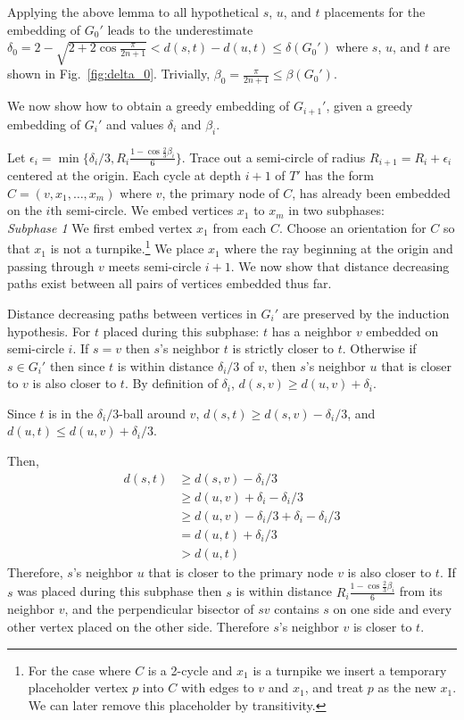\documentclass[11pt]{article}
\begin{document}
Applying the above lemma to all hypothetical $s$, $u$, and $t$ placements for the
embedding of $G_0'$ leads to the underestimate 
$\delta_0 = 2 - \sqrt{2 + 2\cos{\frac{\pi}{2n+1}}} 
< d(s,t)-d(u,t) \leq \delta(G_0')$ where $s$, $u$, and $t$ are shown in Fig.~\ref{fig:delta_0}. Trivially, $\beta_0 = \frac{\pi}{2n+1} \leq \beta(G_0')$.

We now show how to obtain a greedy embedding of $G_{i+1}'$, given a greedy embedding of $G_i'$ and values $\delta_i$ and $\beta_i$.

Let $\epsilon_i = \min\{\delta_i/3, R_i\frac{1-\cos{\frac{2}{3}\beta_i}}{6}\}$.
Trace out a semi-circle of radius $R_{i+1} = R_i + \epsilon_i$ centered at 
the origin. Each cycle at depth $i+1$ of $T'$ has the form $C=(v, x_1,\ldots, x_m)$ 
where $v$, the primary node of $C$, has already been embedded on the $i$th 
semi-circle. We embed vertices $x_1$ to $x_m$ in two subphases: \\

\noindent\emph{Subphase 1} We first embed vertex $x_1$ from each $C$. 
Choose an orientation for $C$ so that $x_1$ is not a turnpike.\footnote{For 
the case where $C$ is a 2-cycle and $x_1$ is a turnpike we insert a
temporary placeholder vertex $p$ into $C$ with edges to $v$ and $x_1$, and treat
$p$ as the new $x_1$. We can later remove this placeholder by transitivity.} We place $x_1$ where the ray beginning at the origin 
and passing through $v$ meets semi-circle $i+1$. We now show that distance 
decreasing paths exist between all pairs of vertices embedded thus far. 

Distance decreasing paths between vertices in $G_i'$ are preserved by the 
induction hypothesis. For $t$ placed during this subphase: $t$ has a neighbor $v$ 
embedded on semi-circle $i$. If $s=v$ then $s$'s neighbor $t$ is strictly closer to $t$. 
Otherwise if $s\in G_i'$ then since $t$ is within distance $\delta_i/3$ of $v$, 
then $s$'s neighbor $u$ that is closer to $v$ is also closer to $t$. 
\ifFull
By definition of $\delta_i$, $d(s,v) \geq d(u,v) + \delta_i$.

Since $t$ is in the $\delta_i/3$-ball around $v$, 
$d(s,t) \geq d(s,v) - \delta_i/3$, and $d(u,t) \leq d(u,v) + \delta_i/3$.

Then,
\begin{align*}
    d(s,t) &\geq d(s,v) - \delta_i/3\\
           &\geq d(u,v) + \delta_i - \delta_i/3\\
           &\geq d(u,v) - \delta_i/3  + \delta_i - \delta_i/3\\
           &= d(u,t) + \delta_i/3\\
           &> d(u,t)
\end{align*}
Therefore, $s$'s neighbor $u$ that is closer to the primary node $v$ is also closer to $t$.
\fi
If $s$ was placed during this subphase then $s$ is within distance
$R_i\frac{1-\cos{\frac{2}{3}\beta_i}}{6}$ from its neighbor $v$, and
the perpendicular bisector of $sv$ contains $s$ on one side and 
every other vertex placed on the other side. Therefore $s$'s neighbor 
$v$ is closer to $t$.
\end{document}
